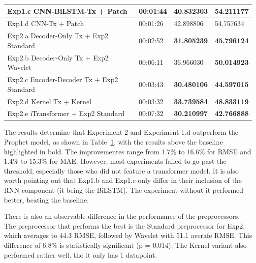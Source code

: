 \begin{table}[ht]
\begin{tabular}{|l|l|l|l|}
    Exp1.c CNN-BiLSTM-Tx + Patch & 00:01:44 & 40.832303 & 54.211177 \\ \hline
    Exp1.d CNN-Tx + Patch & 00:01:26 & 42.898806 & 54.757634 \\ \hline
    Exp2.a Decoder-Only Tx + Exp2 Standard & 00:02:52 & \textbf{31.805239} & \textbf{45.796124} \\ \hline
    Exp2.b Decoder-Only Tx + Exp2 Wavelet & 00:06:11 & 36.966030 & \textbf{50.014923} \\ \hline
    Exp2.c Encoder-Decoder Tx + Exp2 Standard & 00:03:43 & \textbf{30.480106} & \textbf{44.597015} \\ \hline
    Exp2.d Kernel Tx + Kernel & 00:03:32 & \textbf{33.739584} & \textbf{48.833119} \\ \hline
    Exp2.e iTransformer + Exp2 Standard & 00:07:32 & \textbf{30.210997} & \textbf{42.766888} \\ \hline
\end{tabular}\label{table:results}
\end{table}

The results determine that Experiment 2 and Experiment 1.d outperform the Prophet model, as shown in Table~\ref{table:results}, with the results above the baseline highlighted in bold.
The improvementes range from 1.7\% to 16.6\% for RMSE and 1.4\% to 15.3\% for MAE. However, most experiments failed to go past the threshold, especially those who did not feature a transformer model. It is also worth pointing out that Exp1.b and Exp1.c
only differ in their inclusion of the RNN component (it being the BiLSTM). The experiment without it performed better, beating the baseline.

There is also an observable difference in the performance of the preprocessors. The preprocessor that performs the best is the Standard preprocessor for Exp2, which averages to 44.3 RMSE, followed by Wavelet with 51.1 averafe RMSE. This difference of 6.8\% is statistically significant (p = 0.014).
The Kernel variant also performed rather well, tho it only has 1 datapoint.